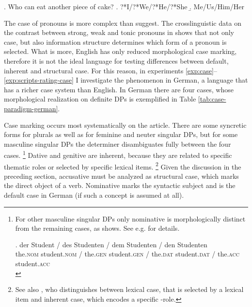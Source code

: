\ex. Who can eat another piece of cake? \hfill \citep[77]{barton.progovac2005} 
\a. ?*I/?*We/?*He/?*She
\b. Me/Us/Him/Her

The case of pronouns is more complex than \citet{barton.progovac2005} suggest. The crosslinguistic data on the contrast between strong, weak and tonic pronouns in \citet{merchant2004} shows that not only case, but also information structure determines which form of a pronoun is selected. What is more, English has only reduced morphological case marking, therefore it is not the ideal language for testing differences between default, inherent and structural case. For this reason, in experiments \ref{exp:case}--\ref{exp:scripts-rating-case} I investigate the phenomenon in German, a language that has a richer case system than English. In German there are four cases, whose morphological realization on definite DPs is exemplified in Table \ref{tab:case-paradigm-german}.

Case marking occurs most systematically on the article. There are some syncretic forms for plurals as well as for feminine and neuter singular DPs, but for some masculine singular DPs the determiner disambiguates fully between the four cases.%
%
\footnote{For other masculine singular DPs only nominative is morphologically distinct from the remaining cases, as \Next shows. See e.g. \citet[139--141]{eisenberg1999} for details.

\exg. der Student / des Studenten / dem Studenten /  den Studenten\\
      the.\textsc{nom} student.\textsc{nom} /  the.\textsc{gen} student.\textsc{gen} / the.\textsc{dat} student.\textsc{dat} /  the.\textsc{acc} student.\textsc{acc}\\


}\afterfn%
%
Dative and genitive are inherent, because they are related to specific thematic roles or selected by specific lexical items.%
%
\footnote{See also \citet{woolford2006}, who distinguishes between lexical case, that is selected by a lexical item and inherent case, which encodes a specific \texttheta-role.}\afterfn%
% 
Given the discussion in the preceding section, accusative must be analyzed as structural case, which marks the direct object of a verb. Nominative marks the syntactic subject and is the default case in German (if such a concept is assumed at all).

